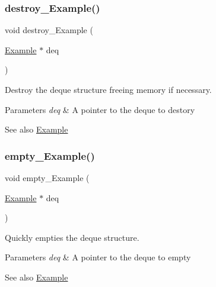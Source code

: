 \subsubsection{\texorpdfstring{destroy\+\_\+\+Example()}{destroy\_Example()}}
{\footnotesize\ttfamily void destroy\+\_\+\+Example (\begin{DoxyParamCaption}\item[{\hyperlink{structExample}{Example} $\ast$}]{deq }\end{DoxyParamCaption})}



Destroy the deque structure freeing memory if necessary. 


\begin{DoxyParams}{Parameters}
{\em deq} & A pointer to the deque to destory\\
\hline
\end{DoxyParams}
\begin{DoxySeeAlso}{See also}
\hyperlink{structExample}{Example} 
\end{DoxySeeAlso}
\mbox{\label{group__DEQUE_gab8ed3578aa5708a09831653caaa88b8a}} 
\subsubsection{\texorpdfstring{empty\+\_\+\+Example()}{empty\_Example()}}
{\footnotesize\ttfamily void empty\+\_\+\+Example (\begin{DoxyParamCaption}\item[{\hyperlink{structExample}{Example} $\ast$}]{deq }\end{DoxyParamCaption})}



Quickly empties the deque structure. 


\begin{DoxyParams}{Parameters}
{\em deq} & A pointer to the deque to empty\\
\hline
\end{DoxyParams}
\begin{DoxySeeAlso}{See also}
\hyperlink{structExample}{Example} 
\end{DoxySeeAlso}
\mbox{\label{group__DEQUE_ga43fb8662cb9960b573bc2368b27a915c}} 
